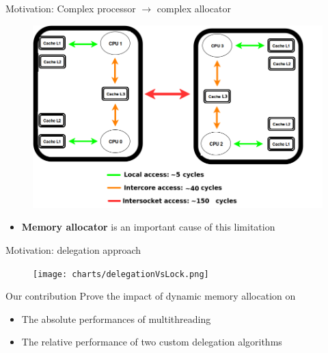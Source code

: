 \documentclass[xcolor=x11names,compress]{beamer}
\renewcommand{\(}{\begin{columns}}
\renewcommand{\)}{\end{columns}}
\newcommand{\<}[1]{\begin{column}{#1}}
\renewcommand{\>}{\end{column}}
\begin{document}

\begin{frame}{Motivation: Complex processor $\rightarrow$ complex allocator}
	\begin{figure}[t]
	\begin{center}
		\subfloat
	    {
			\includegraphics[width=0.8\linewidth]{charts/numaNode.png}
		}
	\end{center}
	\end{figure}

	\begin{itemize}
		\item \textbf{Memory allocator} is an important cause of this limitation
	\end{itemize}
\end{frame}



\begin{frame}{Motivation: delegation approach}
	\begin{figure}[t]
	\begin{center}
		\subfloat
	    {
			\texttt{[image: charts/delegationVsLock.png]}
		}
	\end{center}
	\end{figure}
\end{frame}



\begin{frame}{Our contribution}
	Prove the impact of dynamic  memory allocation on
	\begin{itemize}
		\item The absolute performances of multithreading
		\item The relative performance of two custom delegation algorithms
	\end{itemize}
\end{frame}
\end{document}
